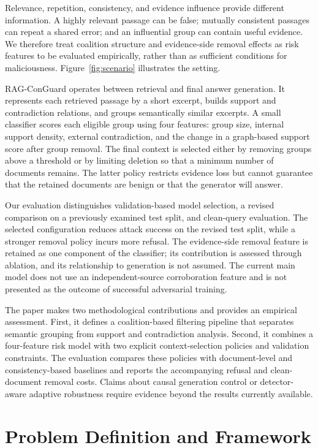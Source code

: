 \documentclass[sigconf]{acmart}
\begin{document}
Relevance, repetition, consistency, and evidence influence provide different information. A highly relevant passage can be false; mutually consistent passages can repeat a shared error; and an influential group can contain useful evidence. We therefore treat coalition structure and evidence-side removal effects as risk features to be evaluated empirically, rather than as sufficient conditions for maliciousness. Figure~\ref{fig:scenario} illustrates the setting.

RAG-ConGuard operates between retrieval and final answer generation. It represents each retrieved passage by a short excerpt, builds support and contradiction relations, and groups semantically similar excerpts. A small classifier scores each eligible group using four features: group size, internal support density, external contradiction, and the change in a graph-based support score after group removal. The final context is selected either by removing groups above a threshold or by limiting deletion so that a minimum number of documents remains. The latter policy restricts evidence loss but cannot guarantee that the retained documents are benign or that the generator will answer.

Our evaluation distinguishes validation-based model selection, a revised comparison on a previously examined test split, and clean-query evaluation. The selected configuration reduces attack success on the revised test split, while a stronger removal policy incurs more refusal. The evidence-side removal feature is retained as one component of the classifier; its contribution is assessed through ablation, and its relationship to generation is not assumed. The current main model does not use an independent-source corroboration feature and is not presented as the outcome of successful adversarial training.

The paper makes two methodological contributions and provides an empirical assessment. First, it defines a coalition-based filtering pipeline that separates semantic grouping from support and contradiction analysis. Second, it combines a four-feature risk model with two explicit context-selection policies and validation constraints. The evaluation compares these policies with document-level and consistency-based baselines and reports the accompanying refusal and clean-document removal costs. Claims about causal generation control or detector-aware adaptive robustness require evidence beyond the results currently available.

\section{Problem Definition and Framework}
\end{document}
